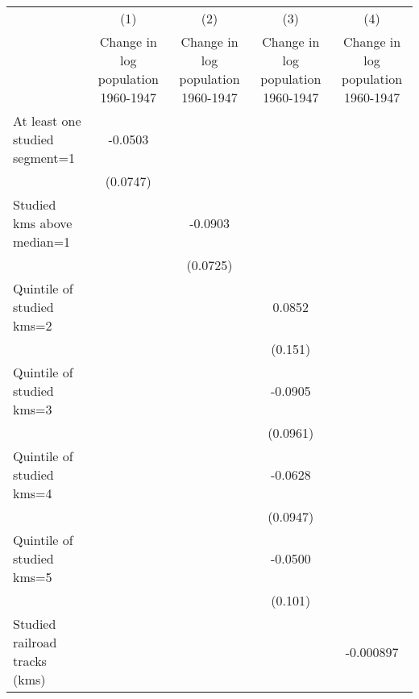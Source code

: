 {
\def\sym#1{\ifmmode^{#1}\else\(^{#1}\)\fi}
\begin{tabular}{l*{4}{c}}
\hline\hline
                    &\multicolumn{1}{c}{(1)}&\multicolumn{1}{c}{(2)}&\multicolumn{1}{c}{(3)}&\multicolumn{1}{c}{(4)}\\
                    &\multicolumn{1}{c}{Change in log population 1960-1947}&\multicolumn{1}{c}{Change in log population 1960-1947}&\multicolumn{1}{c}{Change in log population 1960-1947}&\multicolumn{1}{c}{Change in log population 1960-1947}\\
\hline
At least one studied segment=1&     -0.0503         &                     &                     &                     \\
                    &    (0.0747)         &                     &                     &                     \\
[1em]
Studied kms above median=1&                     &     -0.0903         &                     &                     \\
                    &                     &    (0.0725)         &                     &                     \\
[1em]
Quintile of studied kms=2&                     &                     &      0.0852         &                     \\
                    &                     &                     &     (0.151)         &                     \\
[1em]
Quintile of studied kms=3&                     &                     &     -0.0905         &                     \\
                    &                     &                     &    (0.0961)         &                     \\
[1em]
Quintile of studied kms=4&                     &                     &     -0.0628         &                     \\
                    &                     &                     &    (0.0947)         &                     \\
[1em]
Quintile of studied kms=5&                     &                     &     -0.0500         &                     \\
                    &                     &                     &     (0.101)         &                     \\
[1em]
Studied railroad tracks (kms)&                     &                     &                     &   -0.000897         \\

\end{tabular}}
